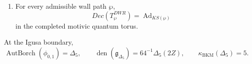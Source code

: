 \begin{theorem}
\begin{enumerate}
At finite height this means the inverse system of radical-quotient
doubles
\(D^{\mathrm{red},\leq H}_{\hbar}(K3\times E,\sigma)\) of
Theorem~\ref{thm:k3e-finite-compact-hall-drinfeld-double}, with
canonical compact source packets recorded by
Theorem~\ref{thm:k3e-canonical-finite-source-packets}; the
displayed completed object is recognised as the \(\Delta_5\) current
double only under
Theorem~\ref{thm:k3e-constructed-finite-double-recognition} at every
height. The universal defect-killing quotient is the recognition
envelope of Theorem~\ref{thm:k3e-finite-recognition-envelope}; the
finite source-matrix theorem
Theorem~\ref{thm:k3e-source-matrix-faithfulness} supplies the
injectivity condition needed to recover the unquotiented source.
\item For every admissible wall path \(\wp\),
\[
 Dec(T^{DWR}_{\wp})=\operatorname{Ad}_{KS(\wp)}
\]
in the completed motivic quantum torus.
\end{enumerate}
At the Igusa boundary,
\[
 \operatorname{AutBorch}(\phi_{0,1})=\Delta_5,\qquad
 \operatorname{den}(\mathfrak g_{\Delta_5})=64^{-1}\Delta_5(2Z),
 \qquad
 \kappa_{\mathrm{BKM}}(\Delta_5)=5.
\]
\end{theorem}


